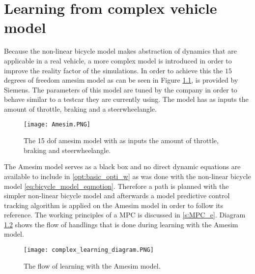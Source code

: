 \chapter{Learning from complex vehicle model}
\label{cha:Tracking_MPC}


Because the non-linear bicycle model makes abstraction of dynamics that are applicable in a real vehicle, a more complex model is introduced in order to improve the reality factor of the simulations. In order to achieve this the $15$ degrees of freedom amesim model as can be seen in Figure \ref{fig:Amesim}, is provided by Siemens. The parameters of this model are tuned by the company in order to behave similar to a testcar they are currently using. The model has as inputs the amount of throttle, braking and a steerwheelangle.  

\begin{figure}[h!]
	\centering
	\texttt{[image: Amesim.PNG]}
	\caption{The 15 dof amesim model with as inputs the amount of throttle, braking and steerwheelangle.}	
	\label{fig:Amesim}
\end{figure}

The Amesim model serves as a black box and no direct dynamic equations are available 
to include in \ref{opt:basic_opti_w} as was done with the non-linear bicycle model \ref{eq:bicycle_model_eqmotion}. Therefore a path is planned with the simpler non-linear bicycle model and afterwards a model predictive control tracking algorithm is applied on the Amesim model in order to follow its reference. The working principles of a MPC is discussed in \ref{s:MPC_e}. Diagram \ref{fig:complex_learning} shows the flow of handlings that is done during learning with the Amesim model.

\begin{figure}[h!]
	\centering
	\texttt{[image: complex\_learning\_diagram.PNG]}
	\caption{The flow of learning with the Amesim model.}	
	\label{fig:complex_learning}
\end{figure}


